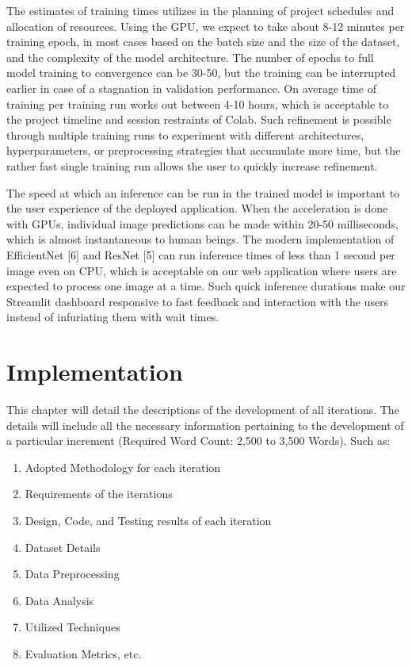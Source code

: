 \documentclass[12pt, openany]{report}
\begin{document}
The estimates of training times utilizes in the planning of project schedules and allocation of resources. Using the GPU, we expect to take about 8-12 minutes per training epoch, in most cases based on the batch size and the size of the dataset, and the complexity of the model architecture. The number of epochs to full model training to convergence can be 30-50, but the training can be interrupted earlier in case of a stagnation in validation performance. On average time of training per training run works out between 4-10 hours, which is acceptable to the project timeline and session restraints of Colab. Such refinement is possible through multiple training runs to experiment with different architectures, hyperparameters, or preprocessing strategies that accumulate more time, but the rather fast single training run allows the user to quickly increase refinement.

The speed at which an inference can be run in the trained model is important to the user experience of the deployed application. When the acceleration is done with GPUs, individual image predictions can be made within 20-50 milliseconds, which is almost instantaneous to human beings. The modern implementation of EfficientNet [6] and ResNet [5] can run inference times of less than 1 second per image even on CPU, which is acceptable on our web application where users are expected to process one image at a time. Such quick inference durations make our Streamlit dashboard responsive to fast feedback and interaction with the users instead of infuriating them with wait times.





\chapter{Implementation}
This chapter will detail the descriptions of the development of all iterations. The details will include all the necessary information pertaining to the development of a particular increment (Required Word Count: 2,500 to 3,500 Words). Such as:

\begin{enumerate}
    \item Adopted Methodology for each iteration
    \item Requirements of the iterations
    \item Design, Code, and Testing results of each iteration
    \item Dataset Details
    \item Data Preprocessing
    \item Data Analysis
    \item Utilized Techniques
    \item Evaluation Metrics, etc.
\end{enumerate}
\end{document}
